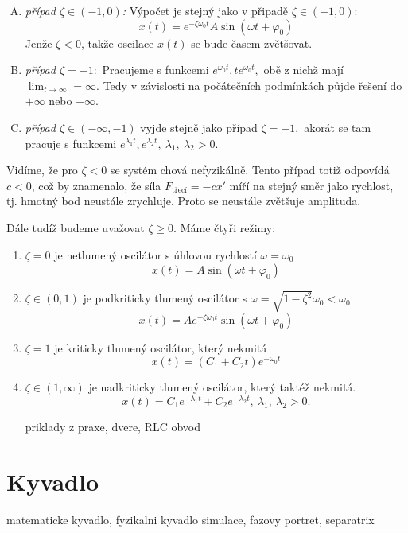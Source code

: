 \begin{enumerate}[(A)]
\item \textit{případ $\zeta\in(-1,0)$:} Výpočet je stejný jako v připadě $\zeta\in(-1,0)$:
\begin{equation*}
  x(t)=e^{-\zeta \omega_0 t}A\sin(\omega t+\varphi_0)
\end{equation*}
Jenže $\zeta<0$, takže oscilace $x(t)$ se bude časem zvětšovat.

\item \textit{případ $\zeta=-1:$} Pracujeme s funkcemi $e^{\omega_0t}, te^{\omega_0 t},$ obě z nichž mají $\lim_{t\to \infty}=\infty.$ Tedy v závislosti na počátečních podmínkách půjde řešení do $+\infty$ nebo $-\infty$.

\item \textit{případ $\zeta\in(-\infty,-1)$} vyjde stejně jako případ $\zeta=-1,$ akorát se tam pracuje s funkcemi $e^{\lambda_1 t}, e^{\lambda_2 t},\ \lambda_1,\ \lambda_2>0.$
\end{enumerate}

Vidíme, že pro $\zeta<0$ se systém chová nefyzikálně. Tento případ totiž odpovídá $c<0$, což by znamenalo, že síla $F_{\text{třecí}}=-cx'$ míří na stejný směr jako rychlost, tj. hmotný bod neustále zrychluje. Proto se neustále zvětšuje amplituda.

Dále tudíž budeme uvažovat $\zeta \geq 0$. Máme čtyři režimy:
\begin{enumerate}
	\item $\zeta=0$ je netlumený oscilátor s úhlovou rychlostí $\omega=\omega_0$
\begin{equation*}
  x(t)=A\sin(\omega t+\varphi_0)
\end{equation*}
	\item $\zeta\in (0,1)$ je podkriticky tlumený oscilátor s $\omega=\sqrt{1-\zeta^{2}}\omega_0<\omega_0$
\begin{equation*}
  x(t)=Ae^{-\zeta \omega_0 t}\sin(\omega t+\varphi_0)
\end{equation*}
	\item $\zeta=1$ je kriticky tlumený oscilátor, který nekmitá
\begin{equation*}
  x(t)=(C_1+C_2t)e^{-\omega_0 t}
\end{equation*}
	\item $\zeta\in (1,\infty)$ je nadkriticky tlumený oscilátor, který taktéž nekmitá.
\begin{equation*}
  x(t)=C_1e^{-\lambda_1 t}+C_2e^{-\lambda_2 t},\ \lambda_1,\ \lambda_2>0.
\end{equation*}
\begin{Todo}
  priklady z praxe, dvere, RLC obvod
\end{Todo}
\end{enumerate}

\section{Kyvadlo}
\begin{Todo}
  matematicke kyvadlo, fyzikalni kyvadlo simulace, fazovy portret, separatrix
\end{Todo}
